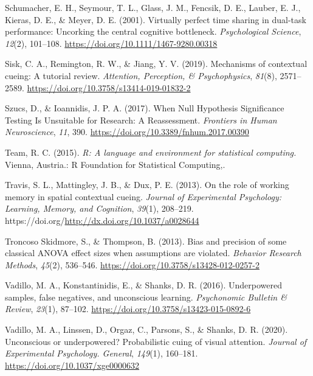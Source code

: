 \documentclass[
  man]{apa6}
\newlength{\cslhangindent}
\newlength{\cslentryspacingunit} %
\newenvironment{CSLReferences}[2] %
 {%
  \setlength{\parindent}{0pt}
  \ifodd #1
  \let\oldpar\par
  \def\par{\hangindent=\cslhangindent\oldpar}
  \fi
  \setlength{\parskip}{#2\cslentryspacingunit}
 }%
 {}
\begin{document}
\begin{CSLReferences}{1}{0}
\leavevmode{}%
Schumacher, E. H., Seymour, T. L., Glass, J. M., Fencsik, D. E., Lauber, E. J., Kieras, D. E., \& Meyer, D. E. (2001). Virtually perfect time sharing in dual-task performance: Uncorking the central cognitive bottleneck. \emph{Psychological Science}, \emph{12}(2), 101--108. \url{https://doi.org/10.1111/1467-9280.00318}

\leavevmode{}%
Sisk, C. A., Remington, R. W., \& Jiang, Y. V. (2019). Mechanisms of contextual cueing: {A} tutorial review. \emph{Attention, Perception, \& Psychophysics}, \emph{81}(8), 2571--2589. \url{https://doi.org/10.3758/s13414-019-01832-2}

\leavevmode{}%
Szucs, D., \& Ioannidis, J. P. A. (2017). When {Null Hypothesis Significance Testing Is Unsuitable} for {Research}: {A Reassessment}. \emph{Frontiers in Human Neuroscience}, \emph{11}, 390. \url{https://doi.org/10.3389/fnhum.2017.00390}

\leavevmode{}%
Team, R. C. (2015). \emph{R: {A} language and environment for statistical computing.} {Vienna, Austria.}: R Foundation for Statistical Computing,.

\leavevmode{}%
Travis, S. L., Mattingley, J. B., \& Dux, P. E. (2013). On the role of working memory in spatial contextual cueing. \emph{Journal of Experimental Psychology: Learning, Memory, and Cognition}, \emph{39}(1), 208--219. https://doi.org/\url{http://dx.doi.org/10.1037/a0028644}

\leavevmode{}%
Troncoso Skidmore, S., \& Thompson, B. (2013). Bias and precision of some classical {ANOVA} effect sizes when assumptions are violated. \emph{Behavior Research Methods}, \emph{45}(2), 536--546. \url{https://doi.org/10.3758/s13428-012-0257-2}

\leavevmode{}%
Vadillo, M. A., Konstantinidis, E., \& Shanks, D. R. (2016). Underpowered samples, false negatives, and unconscious learning. \emph{Psychonomic Bulletin \& Review}, \emph{23}(1), 87--102. \url{https://doi.org/10.3758/s13423-015-0892-6}

\leavevmode{}%
Vadillo, M. A., Linssen, D., Orgaz, C., Parsons, S., \& Shanks, D. R. (2020). Unconscious or underpowered? {Probabilistic} cuing of visual attention. \emph{Journal of Experimental Psychology. General}, \emph{149}(1), 160--181. \url{https://doi.org/10.1037/xge0000632}


\end{CSLReferences}
\end{document}
